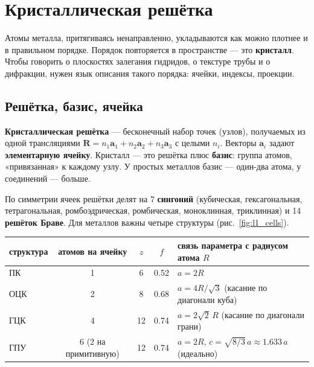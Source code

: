 \chapter{Кристаллическая решётка}\label{ch:lattice}

Атомы металла, притягиваясь ненаправленно, укладываются как можно плотнее и в правильном порядке. Порядок
повторяется в пространстве --- это \textbf{кристалл}. Чтобы говорить о плоскостях залегания гидридов, о текстуре
трубы и о дифракции, нужен язык описания такого порядка: ячейки, индексы, проекции.

\section{Решётка, базис, ячейка}

\textbf{Кристаллическая решётка} --- бесконечный набор точек (узлов), получаемых из одной трансляциями
$\mathbf R = n_1\mathbf a_1 + n_2\mathbf a_2 + n_3\mathbf a_3$ с целыми $n_i$. Векторы $\mathbf a_i$ задают
\textbf{элементарную ячейку}. Кристалл --- это решётка плюс \textbf{базис}: группа атомов, «привязанная» к
каждому узлу. У простых металлов базис --- один-два атома, у соединений --- больше.

По симметрии ячеек решётки делят на 7 \textbf{сингоний} (кубическая, гексагональная, тетрагональная,
ромбоэдрическая, ромбическая, моноклинная, триклинная) и 14 \textbf{решёток Браве}. Для металлов важны четыре
структуры (рис.~\ref{fig:l1_cells}).


\begin{center}\small
\begin{tabular}{lcccl}
\toprule
структура & атомов на ячейку & $z$ & $f$ & связь параметра с радиусом атома $R$ \\
\midrule
ПК & 1 & 6 & 0.52 & $a = 2R$ \\
ОЦК & 2 & 8 & 0.68 & $a = 4R/\sqrt3$ (касание по диагонали куба) \\
ГЦК & 4 & 12 & 0.74 & $a = 2\sqrt2\,R$ (касание по диагонали грани) \\
ГПУ & 6 (2 на примитивную) & 12 & 0.74 & $a = 2R$, $c = \sqrt{8/3}\,a\approx1.633\,a$ (идеально) \\
\bottomrule
\end{tabular}
\end{center}

